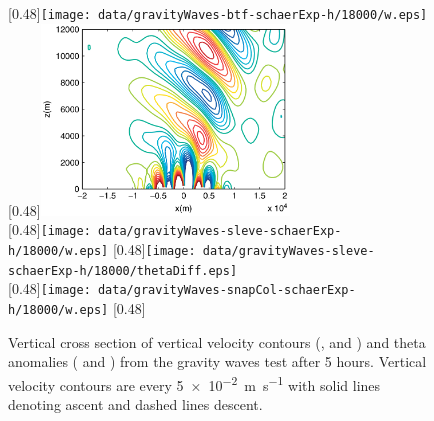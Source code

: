 \begin{figure}
	\captionsetup[subfigure]{position=b}
	\centering
	[0.48\textwidth]{\texttt{[image: data/gravityWaves-btf-schaerExp-h/18000/w.eps]}}
	\hfill
	[0.48\textwidth]{\includegraphics[height=2in]{img/melvin-7a.png}} \\
	[0.48\textwidth]{\texttt{[image: data/gravityWaves-sleve-schaerExp-h/18000/w.eps]}}
	\hfill
	[0.48\textwidth]{\texttt{[image: data/gravityWaves-sleve-schaerExp-h/18000/thetaDiff.eps]}} \\
	[0.48\textwidth]{\texttt{[image: data/gravityWaves-snapCol-schaerExp-h/18000/w.eps]}}
	\hfill
	[0.48\textwidth]{}
%
	\caption{Vertical cross section of vertical velocity contours (,  and ) and theta anomalies ( and ) from the gravity waves test after 5 hours.  Vertical velocity contours are every \SI{5e-2}{\meter\per\second} with solid lines denoting ascent and dashed lines descent.}
	\label{fig:gw:w}
\end{figure}

